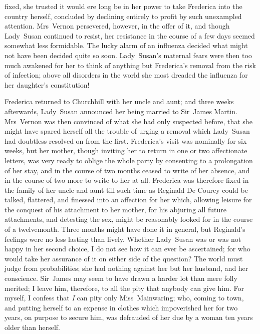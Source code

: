 fixed, she trusted it would ere long be in her power to take Frederica into the country herself, concluded by declining entirely to profit by such unexampled attention. Mrs~Vernon persevered, however, in the offer of it, and though Lady~Susan continued to resist, her resistance in the course of a few days seemed somewhat less formidable. The lucky alarm of an influenza decided what might not have been decided quite so soon. Lady~Susan's maternal fears were then too much awakened for her to think of anything but Frederica's removal from the risk of infection; above all disorders in the world she most dreaded the influenza for her daughter's constitution!

Frederica returned to Churchhill with her uncle and aunt; and three weeks afterwards, Lady~Susan announced her being married to Sir~James Martin. Mrs~Vernon was then convinced of what she had only suspected before, that she might have spared herself all the trouble of urging a removal which Lady~Susan had doubtless resolved on from the first. Frederica's visit was nominally for six weeks, but her mother, though inviting her to return in one or two affectionate letters, was very ready to oblige the whole party by consenting to a prolongation of her stay, and in the course of two months ceased to write of her absence, and in the course of two more to write to her at all. Frederica was therefore fixed in the family of her uncle and aunt till such time as Reginald De Courcy could be talked, flattered, and finessed into an affection for her which, allowing leisure for the conquest of his attachment to her mother, for his abjuring all future attachments, and detesting the sex, might be reasonably looked for in the course of a twelvemonth. Three months might have done it in general, but Reginald's feelings were no less lasting than lively. Whether Lady~Susan was or was not happy in her second choice, I do not see how it can ever be ascertained; for who would take her assurance of it on either side of the question? The world must judge from probabilities; she had nothing against her but her husband, and her conscience. Sir~James may seem to have drawn a harder lot than mere folly merited; I leave him, therefore, to all the pity that anybody can give him. For myself, I confess that \textit{I} can pity only Miss~Mainwaring; who, coming to town, and putting herself to an expense in clothes which impoverished her for two years, on purpose to secure him, was defrauded of her due by a woman ten years older than herself. 